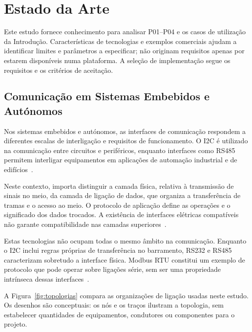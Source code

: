 \chapter{Estado da Arte}
\label{cap:estado-arte}

Este estudo fornece conhecimento para analisar P01--P04 e os casos de
utilização da Introdução. Características de tecnologias e exemplos
comerciais ajudam a identificar limites e parâmetros a especificar;
não originam requisitos apenas por estarem disponíveis numa plataforma.
A seleção de implementação segue os requisitos e os critérios de aceitação.

\section{Comunicação em Sistemas Embebidos e Autónomos}

Nos sistemas embebidos e autónomos, as interfaces de comunicação respondem
a diferentes escalas de interligação e requisitos de funcionamento. O I2C
é utilizado na comunicação entre circuitos e periféricos, enquanto
interfaces como RS485 permitem interligar equipamentos em aplicações de
automação industrial e de
edifícios~\cite{nxp_um10204_2021,stiller_rs485_2015}.

Neste contexto, importa distinguir a camada física, relativa à transmissão
de sinais no meio, da camada de ligação de dados, que organiza a
transferência de tramas e o acesso ao meio. O protocolo de aplicação
define as operações e o significado dos dados trocados. A existência de
interfaces elétricas compatíveis não garante compatibilidade nas camadas
superiores~\cite{dodson_rs232_2023,stiller_rs485_2015,ieee_8023_2018}.

Estas tecnologias não ocupam todas o mesmo âmbito na comunicação.
Enquanto o I2C inclui regras próprias de transferência no barramento,
RS232 e RS485 caracterizam sobretudo a interface física. Modbus RTU
constitui um exemplo de protocolo que pode operar sobre ligações série,
sem ser uma propriedade intrínseca dessas
interfaces~\cite{nxp_um10204_2021,modbus_serial_2006}.

A Figura~\ref{fig:topologias} compara as organizações de ligação usadas
neste estudo. Os desenhos são conceptuais: os nós e os traços ilustram
a topologia, sem estabelecer quantidades de equipamentos, condutores
ou componentes para o projeto.

